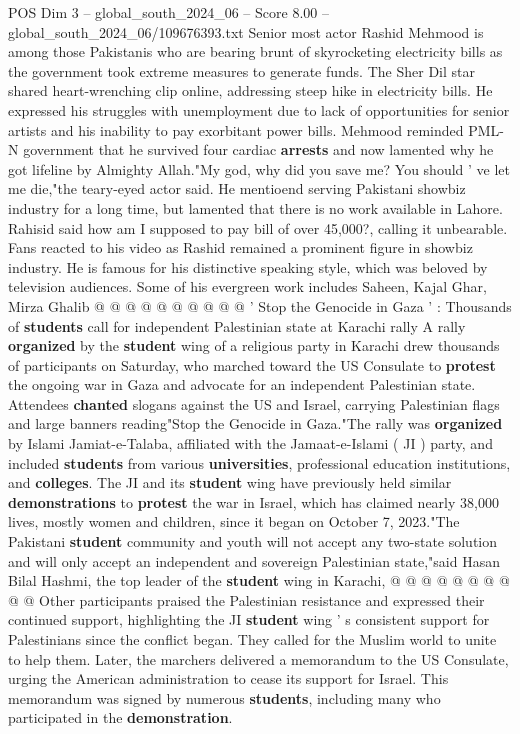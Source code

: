 \begin{textsample}{POS Dim 3 – global\_south\_2024\_06 – Score 8.00 – global\_south\_2024\_06/109676393.txt}  \label{ex:f3_pos_345}
Senior most actor Rashid Mehmood is among those Pakistanis who are bearing brunt of skyrocketing electricity bills as the government took extreme measures to generate funds.
The Sher Dil star shared heart-wrenching clip online, addressing steep hike in electricity bills.
He expressed his struggles with unemployment due to lack of opportunities for senior artists and his inability to pay exorbitant power bills.
Mehmood reminded PML-N government that he survived four cardiac \textbf{arrests} and now lamented why he got lifeline by Almighty Allah."My god, why did you save me?
You should ' ve let me die,"the teary-eyed actor said.
He mentioend serving Pakistani showbiz industry for a long time, but lamented that there is no work available in Lahore.
Rahisid said how am I supposed to pay bill of over 45,000?, calling it unbearable.
Fans reacted to his video as Rashid remained a prominent figure in showbiz industry.
He is famous for his distinctive speaking style, which was beloved by television audiences.
Some of his evergreen work includes Saheen, Kajal Ghar, Mirza Ghalib @ @ @ @ @ @ @ @ @ @ ' Stop the Genocide in Gaza ' : Thousands of \textbf{students} call for independent Palestinian state at Karachi rally A rally \textbf{organized} by the \textbf{student} wing of a religious party in Karachi drew thousands of participants on Saturday, who marched toward the US Consulate to \textbf{protest} the ongoing war in Gaza and advocate for an independent Palestinian state.
Attendees \textbf{chanted} slogans against the US and Israel, carrying Palestinian flags and large banners reading"Stop the Genocide in Gaza."The rally was \textbf{organized} by Islami Jamiat-e-Talaba, affiliated with the Jamaat-e-Islami ( JI ) party, and included \textbf{students} from various \textbf{universities}, professional education institutions, and \textbf{colleges}.
The JI and its \textbf{student} wing have previously held similar \textbf{demonstrations} to \textbf{protest} the war in Israel, which has claimed nearly 38,000 lives, mostly women and children, since it began on October 7, 2023."The Pakistani \textbf{student} community and youth will not accept any two-state solution and will only accept an independent and sovereign Palestinian state,"said Hasan Bilal Hashmi, the top leader of the \textbf{student} wing in Karachi, @ @ @ @ @ @ @ @ @ @ Other participants praised the Palestinian resistance and expressed their continued support, highlighting the JI \textbf{student} wing ' s consistent support for Palestinians since the conflict began.
They called for the Muslim world to unite to help them.
Later, the marchers delivered a memorandum to the US Consulate, urging the American administration to cease its support for Israel.
This memorandum was signed by numerous \textbf{students}, including many who participated in the \textbf{demonstration}.

\end{textsample}
